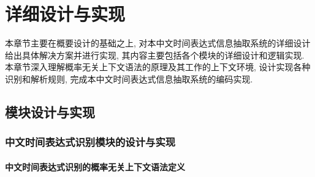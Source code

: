 
\chapter{详细设计与实现}

本章节主要在概要设计的基础之上, 对本中文时间表达式信息抽取系统的详细设计给出具体解决方案并进行实现, 其内容主要包括各个模块的详细设计和逻辑实现.
本章节深入理解概率无关上下文语法的原理及其工作的上下文环境, 设计实现各种识别和解析规则, 完成本中文时间表达式信息抽取系统的编码实现.

\section{模块设计与实现}

\subsection{中文时间表达式识别模块的设计与实现}

\subsubsection{中文时间表达式识别的概率无关上下文语法定义}

